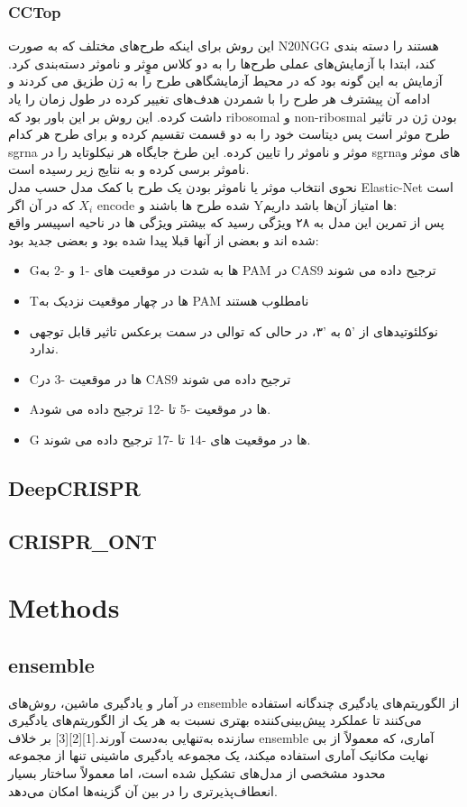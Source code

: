 \documentclass[12pt,a4paper,BCOR=.7cm,headsepline,bibliography=totoc]{report}
\begin{document}
\subsection{CCTop}
این روش برای اینکه طرح‌های مختلف که به صورت N20NGG هستند را دسته بندی کند، ابتدا با آزمایش‌های عملی طرح‌ها را به دو کلاس موٍثر و ناموثر دسته‌بندی کرد. آزمایش به این گونه بود که در محیط آزمایشگاهی طرح را به ژن طزیق می کردند و ادامه آن پیشترف هر طرح را با شمردن هدف‌های تغییر کرده در طول زمان را یاد داشت کرده. این روش بر این باور بود که ribosomal و non-ribosmal بودن ژن در تاثیر طرح موثر است پس دیتاست خود را به دو قسمت تقسیم کرده و برای طرح هر کدام sgrna موثر و ناموثر را تایین کرده. این طرخ جایگاه هر نیکلوتاید را در sgrnaهای موثر و ناموثر برسی کرده و به نتایج زیر رسیده است.\\
نحوی انتخاب موثر یا ناموثر بودن یک طرح با کمک مدل حسب مدل  Elastic-Net است که در آن اگر
 $X_i$
encode شده طرح ها باشند
و Yها امتیاز آن‌ها باشد داریم:
\\
پس از تمرین این مدل به ۲۸ ویژگی رسید که بیشتر ویژگی ها در ناحیه اسپیسر واقع شده اند و بعضی از آنها قبلا پیدا شده بود و بعضی جدید بود:
\begin{itemize}
\item Gها به شدت در موقعیت های -1 و -2 به PAM در CAS9 ترجیح داده می شوند
\item Tها در چهار موقعیت نزدیک به PAM نامطلوب هستند
\item
  نوکلئوتیدهای از '۵ به '۳، در حالی که توالی در سمت برعکس تاثیر قابل توجهی ندارد.
\item Cها در موقعیت -3 در CAS9 ترجیح داده می شوند
\item Aها در موقعیت -5 تا -12 ترجیح داده می شود.
\item G ها در موقعیت های -14 تا -17 ترجیح داده می شوند.
\end{itemize}

\section{DeepCRISPR}

\section{CRISPR\_ONT}

\chapter{Methods}
\section{ensemble}
در آمار و یادگیری ماشین، روش‌های ensemble از الگوریتم‌های یادگیری چندگانه استفاده می‌کنند تا عملکرد پیش‌بینی‌کننده بهتری نسبت به هر یک از الگوریتم‌های یادگیری سازنده به‌تنهایی به‌دست آورند.[1][2][3] بر خلاف ensemble آماری، که معمولاً از بی نهایت مکانیک آماری استفاده میکند، یک مجموعه یادگیری ماشینی تنها از مجموعه محدود مشخصی از مدل‌های تشکیل شده است، اما معمولاً ساختار بسیار انعطاف‌پذیرتری را در بین آن گزینه‌ها امکان می‌دهد.
\end{document}
